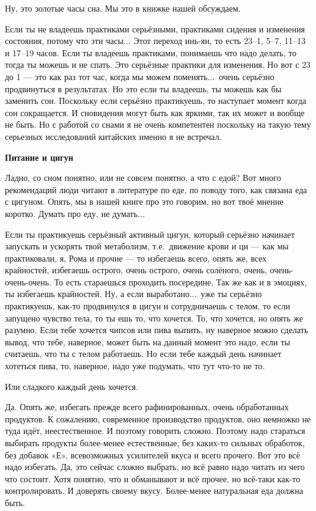 \A
Ну, это золотые часы сна. Мы это в книжке нашей обсуждаем.

\T
Если ты не владеешь практиками серьёзными, практиками сидения и изменения
состояния, потому что
эти часы... Этот переход инь-ян, то есть 23--1, 5--7, 11--13 и 17--19 часов. Если
ты владеешь практиками, понимаешь что надо делать, то тогда ты можешь и не спать.
Это серьёзные практики для изменения. Но вот с 23 до 1 --- это как раз тот час, когда мы можем
поменять...\ очень
серьёзно продвинуться в результатах.
Но это если ты владеешь, ты можешь как бы заменить сон.
Поскольку если серьёзно практикуешь,
то
наступает момент когда сон сокращается.
И сновидения могут быть как яркими, так их может и вообще не быть.
Но с работой со снами я не очень
компетентен поскольку на такую тему
серьезных исследований китайских именно я не встречал.

\null
\centerline{\bf Питание и цигун}
\null

\A
Ладно, со сном понятно, или не совсем понятно, а что с едой? Вот много рекомендаций люди
читают в литературе по
еде, по поводу того, как связана еда с цигуном. Опять, мы в нашей книге про это говорим, но вот
твоё мнение коротко. Думать про еду, не думать...

\T
Если ты практикуешь серьёзный активный цигун, который
серьёзно начинает
запускать и ускорять твой метаболизм, т.е.\ движение крови и ци --- как мы
практиковали, я, Рома и прочие --- то избегаешь всего, опять же, всех крайностей, избегаешь острого,
очень острого, очень
солёного, очень, очень-очень-очень.
То есть стараешься проходить посередине. Так же как и в эмоциях, ты
избегаешь крайностей. Ну, а
если выработано...\ уже ты серьёзно практикуешь, как-то продвинулся в цигун
и сотрудничаешь с телом, то
если
запущено чувство тела, то ты ешь то, что хочется. То, что хочется, но опять же разумно.
Если тебе хочется
чипсов или пива выпить, ну наверное можно сделать вывод, что тебе, наверное, может быть на
данный момент это
надо, если ты считаешь, что ты с телом работаешь.
Но если тебе каждый день начинает хотеться пива, то, наверное, надо уже подумать, что тут
что-то не то.

\A
Или сладкого каждый день хочется.

\T
Да. Опять же, избегать прежде всего рафинированных, очень обработанных продуктов. К
сожалению, современное
производство продуктов, оно немножко не туда идёт, неестественное. И поэтому говорить
сложно. Поэтому надо
стараться выбирать продукты более-менее естественные, без каких-то сильных обработок, без
добавок «Е», всевозможных усилителей вкуса и всего прочего. Вот это всё надо избегать.
Да, это
сейчас сложно выбрать, но всё равно надо читать из чего что состоит.
Хотя понятно, что
и обманывают и всё
прочее, но всё-таки как-то контролировать. И доверять своему вкусу.
Более-менее натуральная
еда должна быть.

